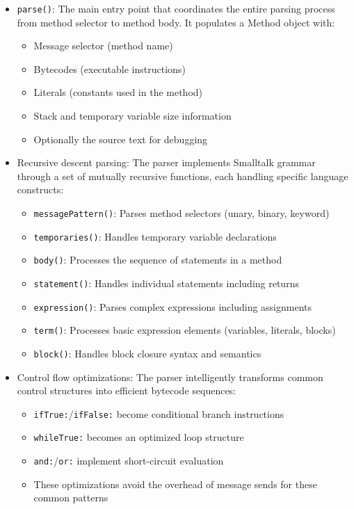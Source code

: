 \documentclass[12pt,a4paper]{report}
\begin{document}
\begin{itemize}
    \item \texttt{parse()}: The main entry point that coordinates the entire parsing process from method selector to method body. It populates a Method object with:
    \begin{itemize}
        \item Message selector (method name)
        \item Bytecodes (executable instructions)
        \item Literals (constants used in the method)
        \item Stack and temporary variable size information
        \item Optionally the source text for debugging
    \end{itemize}

    \item Recursive descent parsing: The parser implements Smalltalk grammar through a set of mutually recursive functions, each handling specific language constructs:
    \begin{itemize}
        \item \texttt{messagePattern()}: Parses method selectors (unary, binary, keyword)
        \item \texttt{temporaries()}: Handles temporary variable declarations
        \item \texttt{body()}: Processes the sequence of statements in a method
        \item \texttt{statement()}: Handles individual statements including returns
        \item \texttt{expression()}: Parses complex expressions including assignments
        \item \texttt{term()}: Processes basic expression elements (variables, literals, blocks)
        \item \texttt{block()}: Handles block closure syntax and semantics
    \end{itemize}

    \item Control flow optimizations: The parser intelligently transforms common control structures into efficient bytecode sequences:
    \begin{itemize}
        \item \texttt{ifTrue:}/\texttt{ifFalse:} become conditional branch instructions
        \item \texttt{whileTrue:} becomes an optimized loop structure
        \item \texttt{and:}/\texttt{or:} implement short-circuit evaluation
        \item These optimizations avoid the overhead of message sends for these common patterns
    \end{itemize}


\end{itemize}
\end{document}
